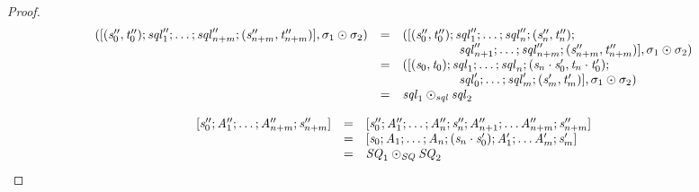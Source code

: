 \documentclass[numbers,10pt,preprint\ifanon ,nocopyrightspace\fi]{sigplanconf}
\begin{document}
\begin{proof}
  \[
    \begin{array}{rcl}
      ([(\mathit{s}_0'',\mathit{t}_0'');\mathit{sql}_1'';
      \ldots;
      \mathit{sql}_{n+m}'';(\mathit{s}_{n+m}'',\mathit{t}_{n+m}'')],
      \sigma_1\odot\sigma_2)
      & = & ([(\mathit{s}_0'',\mathit{t}_0'');\mathit{sql}_1'';
            \ldots;\mathit{sql}_n'';(\mathit{s}_n'',\mathit{t}_n'');\\
      & & \hspace*{4.5em}\mathit{sql}_{n+1}'';
          \ldots;\mathit{sql}_{n+m}'';(\mathit{s}_{n+m}'',\mathit{t}_{n+m}'')],
          \sigma_1\odot\sigma_2)\\
      & = & ([(\mathit{s}_0,\mathit{t}_0);\mathit{sql}_1;
            \ldots;\mathit{sql}_n;(\mathit{s}_n\cdot\mathit{s}_0',\mathit{t}_n\cdot\mathit{t}_0');\\
      & & \hspace*{4.5em}\mathit{sql}_0';
          \ldots;\mathit{sql}_m';(\mathit{s}_m',\mathit{t}_m')],
          \sigma_1\odot\sigma_2)\\
      & = & \mathit{sql}_1\odot_{\mathit{sql}}\mathit{sql}_2
    \end{array}
  \]


  \[
    \begin{array}{rcl}
      [\mathit{s}_0'';\mathit{A}_1'';\ldots;\mathit{A}_{n+m}'';\mathit{s}_{n+m}'']
      & = & [\mathit{s}_0'';\mathit{A}_1'';\ldots;\mathit{A}_n'';\mathit{s}_n'';\mathit{A}_{n+1}'';
            \ldots\mathit{A}_{n+m}'';\mathit{s}_{n+m}'']\\
      & = & [\mathit{s}_0;\mathit{A}_1;\ldots;\mathit{A}_n;(\mathit{s}_n\cdot\mathit{s}_0');\mathit{A}_1';
            \ldots\mathit{A}_m';\mathit{s}_m']\\
      & = & \mathit{SQ}_1\odot_{\mathit{SQ}}\mathit{SQ}_2
    \end{array}
  \]



\end{proof}
\end{document}
